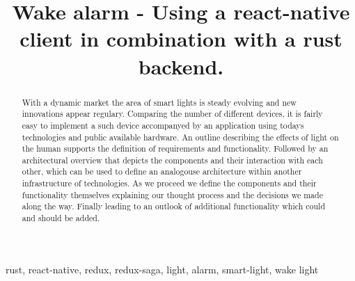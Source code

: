 \documentclass[conference]{IEEEtran}
\begin{document}
\title{Wake alarm - Using a react-native client in combination with a rust backend.}

\author{
\and
{}
}

\maketitle

\begin{abstract}
With a dynamic market the area of smart lights is steady evolving and new innovations appear regulary. Comparing the number of
different devices, it is fairly easy to implement a such device accompanyed by an application using todays technologies
and public available hardware. An outline describing the effects of light on the human supports the definition of requirements
and functionality. Followed by an architectural overview that depicts the components and their interaction with each other, which
can be used to define an analogouse architecture within another infrastructure of technologies. As we proceed we define the
components and their functionality themselves explaining our thought process and the decisions we made along the way. 
Finally leading to an outlook of additional functionality which could and should be added.

\end{abstract}

\begin{IEEEkeywords}
rust, react-native, redux, redux-saga, light, alarm, smart-light, wake light
\end{IEEEkeywords}

\end{document}
